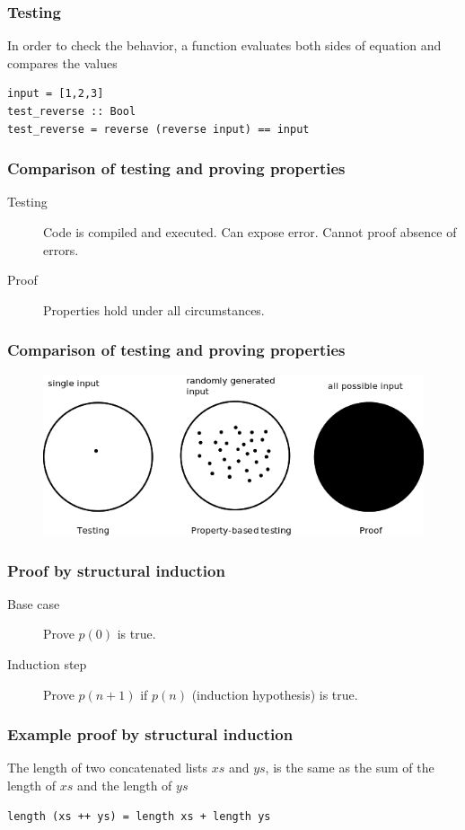 \documentclass{beamer}
\begin{document}
\begin{frame}[fragile]
  \frametitle{Testing}
 In order to check the behavior, a function evaluates both sides of equation and compares the values
\begin{verbatim}
input = [1,2,3]
test_reverse :: Bool
test_reverse = reverse (reverse input) == input
\end{verbatim}
\end{frame}

\begin{frame}
  \frametitle{Comparison of testing and proving properties}
  \begin{description}
  \item[Testing] Code is compiled and executed. Can expose error. Cannot proof absence of errors. 
  \item[Proof] Properties hold under all circumstances.
\end{description}
\end{frame}

\begin{frame}
  \frametitle{Comparison of testing and proving properties}
\begin{figure}
  \centering
     \includegraphics[width=1\textwidth]{testing}
\end{figure}
\end{frame}


\begin{frame}[fragile]
\frametitle{Proof by structural induction}
 \begin{description}
 \item[Base case] Prove $p(0)$ is true.
 \item[Induction step] Prove $p(n+1)$ if $p(n)$ (induction hypothesis) is true.
 \end{description}
\end{frame}

\begin{frame}[fragile]
\frametitle{Example proof by structural induction}
The length of two concatenated lists $xs$ and $ys$, is the same as the sum of the length of $xs$ and the length of $ys$
\begin{verbatim}
length (xs ++ ys) = length xs + length ys
\end{verbatim}

\end{frame}
\end{document}
